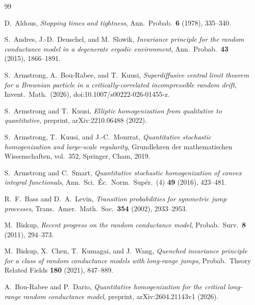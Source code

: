 \documentclass[11pt]{amsart}
\numberwithin{equation}{section}
\begin{document}
\begin{thebibliography}{99}

D.~Aldous,
\emph{Stopping times and tightness},
Ann.\ Probab.\ \textbf{6} (1978), 335--340.

S.~Andres, J.-D.~Deuschel, and M.~Slowik,
\emph{Invariance principle for the random conductance model in a degenerate ergodic environment},
Ann.\ Probab.\ \textbf{43} (2015), 1866--1891.

S.~Armstrong, A.~Bou-Rabee, and T.~Kuusi,
\emph{Superdiffusive central limit theorem for a Brownian particle in a critically-correlated incompressible random drift},
Invent.\ Math.\ (2026), doi:10.1007/s00222-026-01455-z.

S.~Armstrong and T.~Kuusi,
\emph{Elliptic homogenization from qualitative to quantitative},
preprint, arXiv:2210.06488 (2022).

S.~Armstrong, T.~Kuusi, and J.-C.~Mourrat,
\emph{Quantitative stochastic homogenization and large-scale regularity},
Grundlehren der mathematischen Wissenschaften, vol.~352, Springer, Cham, 2019.

S.~Armstrong and C.~Smart,
\emph{Quantitative stochastic homogenization of convex integral functionals},
Ann.\ Sci.\ \'Ec.\ Norm.\ Sup\'er.\ (4) \textbf{49} (2016), 423--481.

R.~F.~Bass and D.~A.~Levin,
\emph{Transition probabilities for symmetric jump processes},
Trans.\ Amer.\ Math.\ Soc.\ \textbf{354} (2002), 2933--2953.

M.~Biskup,
\emph{Recent progress on the random conductance model},
Probab.\ Surv.\ \textbf{8} (2011), 294--373.

M.~Biskup, X.~Chen, T.~Kumagai, and J.~Wang,
\emph{Quenched invariance principle for a class of random conductance models with long-range jumps},
Probab.\ Theory Related Fields \textbf{180} (2021), 847--889.

A.~Bou-Rabee and P.~Dario,
\emph{Quantitative homogenization for the critical long-range random conductance model},
preprint, arXiv:2604.21143v1 (2026).


\end{thebibliography}
\end{document}
